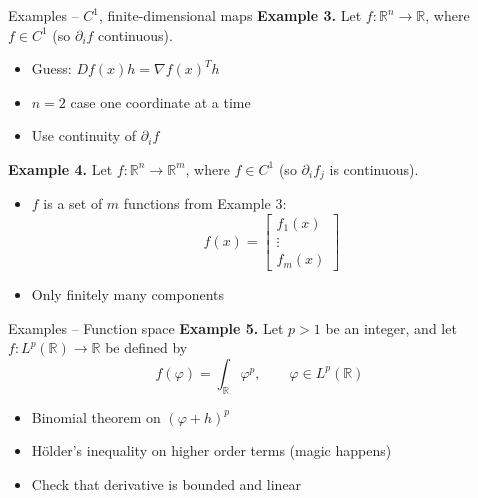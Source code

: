 \documentclass[]{beamer}
\begin{document}
	\begin{frame}{Examples -- $C^1$, finite-dimensional maps}
		\textbf{Example 3.} Let $f : \mathbb{R}^n \to \mathbb{R}$, where $f \in C^1$ (so $\partial_i f$ continuous).
		\begin{itemize}
			\item Guess: $Df(x)h = \nabla f(x)^T h$
			\item $n = 2$ case one coordinate at a time
			\item Use continuity of $\partial_i f$
		\end{itemize}
		\vfill
		
		\textbf{Example 4.} Let $f: \mathbb{R}^n \to \mathbb{R}^m$, where $f \in C^1$ (so $\partial_i f_j$ is continuous). 
		\begin{itemize}
			\item $f$ is a set of $m$ functions from Example 3:
			\begin{equation*}
				f(x) = \left[\begin{matrix}
					f_1(x) \\ \vdots \\ f_m(x)
				\end{matrix}\right]
			\end{equation*}
			\item Only finitely many components
		\end{itemize}
	\end{frame}
	
	\begin{frame}{Examples -- Function space}
		\textbf{Example 5.} Let $p > 1$ be an integer, and let $f : L^p(\mathbb{R}) \to \mathbb{R}$ be defined by
		\begin{equation*}
			f(\varphi) = \int_\mathbb{R} \varphi^p, \qquad \varphi \in L^p(\mathbb{R})
		\end{equation*}
		\begin{itemize}
			\item Binomial theorem on $(\varphi + h)^p$
			\item Hölder's inequality on higher order terms (magic happens)
			\item Check that derivative is bounded and linear
		\end{itemize}
	\end{frame}
	
\end{document}
